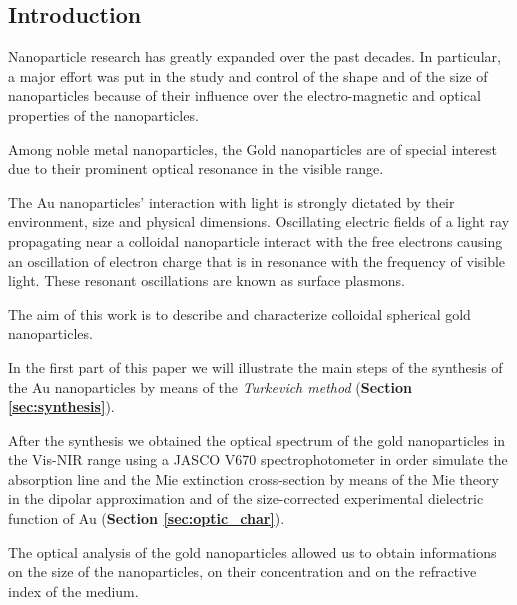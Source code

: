 \documentclass[twocolumn]{article}
\title{}
\author{}
\date{}
\begin{document}
\thispagestyle{fancy}

\thispagestyle{empty}

\tableofcontents

\noindent\makebox[\linewidth]{\color{linescolor} \rule[-0.2cm]{0.85\paperwidth}{1pt}}
\noindent\makebox[\linewidth]{\color{linescolor} \rule[0.3cm]{0.85\paperwidth}{1.2 pt}}


\begin{multicols}{2}
\section{Introduction}
\noindent
Nanoparticle research has greatly expanded over the past decades. 
In particular, a major effort was put in the study and control of the shape and of the size of nanoparticles because of their influence over the electro-magnetic and optical properties of the nanoparticles.

Among noble metal nanoparticles, the Gold nanoparticles are of special interest due to their prominent optical resonance in the visible range.

The Au nanoparticles' interaction with light is strongly dictated by their environment, size and physical dimensions. Oscillating electric fields of a light ray propagating near a colloidal nanoparticle interact with the free electrons causing an oscillation of electron charge that is in resonance with the frequency of visible light. These resonant oscillations are known as surface plasmons. 

The aim of this work is to describe and characterize colloidal spherical gold nanoparticles. 

In the first part of this paper we will illustrate the main steps of the synthesis of the Au nanoparticles by means of the \textit{Turkevich method} (\textbf{Section \ref{sec:synthesis}}). 

After the synthesis we obtained the optical spectrum of the gold nanoparticles in the Vis-NIR range using a JASCO V670 spectrophotometer in order simulate the absorption line and the Mie extinction cross-section by means of the Mie theory in the dipolar approximation and of the size-corrected experimental dielectric function of Au (\textbf{Section \ref{sec:optic_char}}). 

The optical analysis of the gold nanoparticles allowed us to obtain informations on the size of the nanoparticles, on their concentration and on the refractive index of the medium.


\end{multicols}
\end{document}
